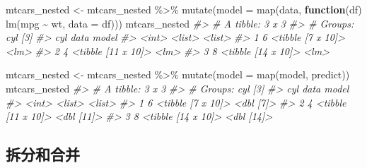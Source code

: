 \documentclass[
]{book}
\newenvironment{Shaded}{\begin{snugshade}}{\end{snugshade}}
\newcommand{\AttributeTok}[1]{\textcolor[rgb]{0.77,0.63,0.00}{#1}}
\newcommand{\CommentTok}[1]{\textcolor[rgb]{0.56,0.35,0.01}{\textit{#1}}}
\newcommand{\ControlFlowTok}[1]{\textcolor[rgb]{0.13,0.29,0.53}{\textbf{#1}}}
\newcommand{\FunctionTok}[1]{\textcolor[rgb]{0.00,0.00,0.00}{#1}}
\newcommand{\NormalTok}[1]{#1}
\newcommand{\OtherTok}[1]{\textcolor[rgb]{0.56,0.35,0.01}{#1}}
\newcommand{\SpecialCharTok}[1]{\textcolor[rgb]{0.00,0.00,0.00}{#1}}
\begin{document}
\begin{Shaded}
\begin{Highlighting}[]
\NormalTok{mtcars\_nested }\OtherTok{\textless{}{-}}\NormalTok{ mtcars\_nested }\SpecialCharTok{\%\textgreater{}\%} 
  \FunctionTok{mutate}\NormalTok{(}\AttributeTok{model =} \FunctionTok{map}\NormalTok{(data, }\ControlFlowTok{function}\NormalTok{(df) }\FunctionTok{lm}\NormalTok{(mpg }\SpecialCharTok{\textasciitilde{}}\NormalTok{ wt, }\AttributeTok{data =}\NormalTok{ df)))}
\NormalTok{mtcars\_nested}
\CommentTok{\#\textgreater{} \# A tibble: 3 x 3}
\CommentTok{\#\textgreater{} \# Groups:   cyl [3]}
\CommentTok{\#\textgreater{}     cyl data               model }
\CommentTok{\#\textgreater{}   \textless{}int\textgreater{} \textless{}list\textgreater{}             \textless{}list\textgreater{}}
\CommentTok{\#\textgreater{} 1     6 \textless{}tibble [7 x 10]\textgreater{}  \textless{}lm\textgreater{}  }
\CommentTok{\#\textgreater{} 2     4 \textless{}tibble [11 x 10]\textgreater{} \textless{}lm\textgreater{}  }
\CommentTok{\#\textgreater{} 3     8 \textless{}tibble [14 x 10]\textgreater{} \textless{}lm\textgreater{}}
\end{Highlighting}
\end{Shaded}

\begin{Shaded}
\begin{Highlighting}[]
\NormalTok{mtcars\_nested }\OtherTok{\textless{}{-}}\NormalTok{ mtcars\_nested }\SpecialCharTok{\%\textgreater{}\%} 
  \FunctionTok{mutate}\NormalTok{(}\AttributeTok{model =} \FunctionTok{map}\NormalTok{(model, predict))}
\NormalTok{mtcars\_nested  }
\CommentTok{\#\textgreater{} \# A tibble: 3 x 3}
\CommentTok{\#\textgreater{} \# Groups:   cyl [3]}
\CommentTok{\#\textgreater{}     cyl data               model     }
\CommentTok{\#\textgreater{}   \textless{}int\textgreater{} \textless{}list\textgreater{}             \textless{}list\textgreater{}    }
\CommentTok{\#\textgreater{} 1     6 \textless{}tibble [7 x 10]\textgreater{}  \textless{}dbl [7]\textgreater{} }
\CommentTok{\#\textgreater{} 2     4 \textless{}tibble [11 x 10]\textgreater{} \textless{}dbl [11]\textgreater{}}
\CommentTok{\#\textgreater{} 3     8 \textless{}tibble [14 x 10]\textgreater{} \textless{}dbl [14]\textgreater{}}
\end{Highlighting}
\end{Shaded}

\hypertarget{ux62c6ux5206ux548cux5408ux5e76}{%
\subsection{拆分和合并}\label{ux62c6ux5206ux548cux5408ux5e76}}
\end{document}
